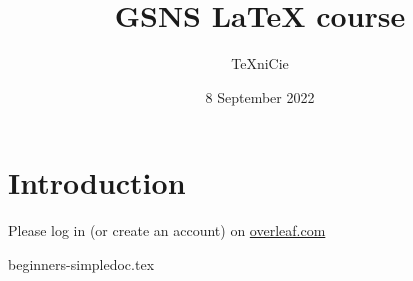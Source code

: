 \documentclass{../../cursuspresentatie}
\title{GSNS \LaTeX{} course}
\author{\TeX niCie}
\date{8 September 2022}
\def\importslide#1#2{%
	{#2}
}
\begin{document}
\section{Introduction}

\begin{frame}
	\titlepage
	\centering

	Please log in (or create an account) on \url{overleaf.com}\\
	
\end{frame}


\importslide{beginners}{beginners-simpledoc.tex}
	

% 

% 

% 

% 

% 

% 

%
	
\end{document}
